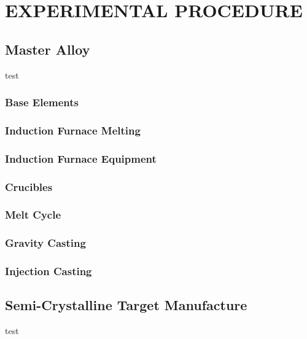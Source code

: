 \documentclass[a4paper,12pt,oneside]{report}%
\begin{document}

\tableofcontents\newpage
{}
\let\cleardoublepage\clearpage


\chapter{EXPERIMENTAL PROCEDURE}

\section{Master Alloy}
 test
\subsection{Base Elements}

\subsection{Induction Furnace Melting}

\subsection{Induction Furnace Equipment}

\subsection{Crucibles}

\subsection{Melt Cycle}

\subsection{Gravity Casting}

\subsection{Injection Casting}

\section{Semi-Crystalline Target Manufacture} 
test
\end{document}
